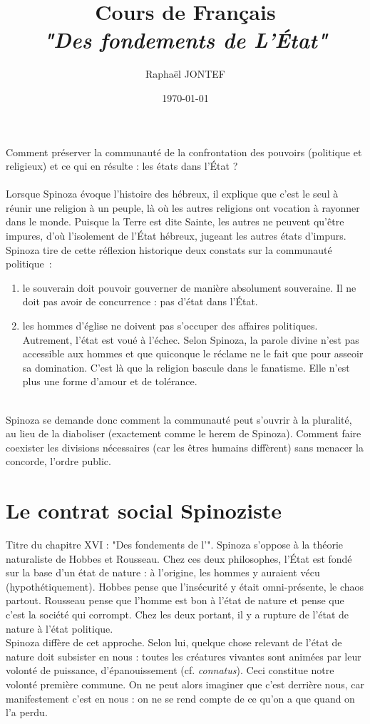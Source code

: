 \documentclass[a4paper,12pt]{article}
\title{Cours de Français\\ \Large \textit{"Des fondements de L'État"}}
\author{Raphaël JONTEF}
\date{\today}
\begin{document}
\maketitle
Comment préserver la communauté de la confrontation des pouvoirs (politique et religieux) et ce qui en résulte : les états dans l'État ?\\\\

Lorsque Spinoza évoque l'histoire des hébreux, il explique que c'est le seul à réunir une religion à un peuple, là où les autres religions ont vocation à rayonner dans le monde. Puisque la Terre est dite Sainte, les autres ne peuvent qu'être impures, d'où l'isolement de l'État hébreux, jugeant les autres états d'impurs. Spinoza tire de cette réflexion historique deux constats sur la communauté politique~:
\begin{enumerate}
    \item le souverain doit pouvoir gouverner de manière absolument souveraine. Il ne doit pas avoir de concurrence : pas d'état dans l'État.
    \item les hommes d'église ne doivent pas s'occuper des affaires politiques. Autrement, l'état est voué à l'échec. Selon Spinoza, la parole divine n'est pas accessible aux hommes et que quiconque le réclame ne le fait que pour asseoir sa domination. C'est là que la religion bascule dans le fanatisme. Elle n'est plus une forme d'amour et de tolérance.
\end{enumerate}
\\
Spinoza se demande donc comment la communauté peut s'ouvrir à la pluralité, au lieu de la diaboliser (exactement comme le herem de Spinoza). Comment faire coexister les divisions nécessaires (car les êtres humains diffèrent) sans menacer la concorde, l'ordre public.

\section{Le contrat social Spinoziste}

Titre du chapitre XVI : "Des fondements de l'". Spinoza s'oppose à la théorie naturaliste de Hobbes et Rousseau. Chez ces deux philosophes, l'État est fondé sur la base d'un état de nature : à l'origine, les hommes y auraient vécu (hypothétiquement). Hobbes pense que l'insécurité y était omni-présente, le chaos partout. Rousseau pense que l'homme est bon à l'état de nature et pense que c'est la société qui corrompt. Chez les deux portant, il y a rupture de l'état de nature à l'état politique. \\
Spinoza diffère de cet approche. Selon lui, quelque chose relevant de l'état de nature doit subsister en nous : toutes les créatures vivantes sont animées par leur volonté de puissance, d'épanouissement (cf. \textit{connatus}). Ceci constitue notre volonté première commune. On ne peut alors imaginer que c'est derrière nous, car manifestement c'est en nous : on ne se rend compte de ce qu'on a que quand on l'a perdu.
\end{document}
